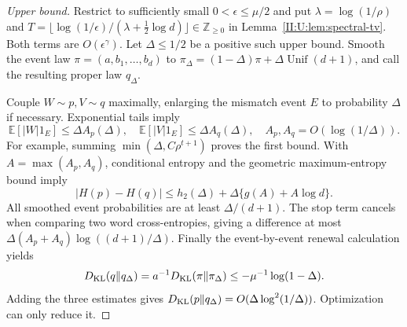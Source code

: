 \begin{proof}[Upper bound]
Restrict to sufficiently small $0<\epsilon\le\mu/2$ and put
$\lambda=\log(1/\rho)$ and
$T=\lfloor\log(1/\epsilon)/(\lambda+\tfrac12\log d)\rfloor\in\mathbb Z_{\ge0}$ in
Lemma~\ref{II:U:lem:spectral-tv}. Both terms are $O(\epsilon^\gamma)$.
Let $\Delta\le1/2$ be a positive such upper bound. Smooth the event
law $\pi=(a,b_1,\ldots,b_d)$ to
$\pi_\Delta=(1-\Delta)\pi+\Delta\operatorname{Unif}(d+1)$,
and call the resulting proper law $q_\Delta$.

Couple $W\sim p,V\sim q$ maximally, enlarging the mismatch event $E$
to probability $\Delta$ if necessary. Exponential tails imply
\[
 \mathbb E[|W|1_E]\le\Delta A_p(\Delta),\quad
 \mathbb E[|V|1_E]\le\Delta A_q(\Delta),\quad A_p,A_q=O(\log(1/\Delta)).
\]
For example, summing $\min(\Delta,C\rho^{t+1})$ proves the first
bound. With $A=\max(A_p,A_q)$, conditional entropy and the geometric
maximum-entropy bound imply
\[
 |H(p)-H(q)|\le h_2(\Delta)+\Delta\{g(A)+A\log d\}.
\]
All smoothed event probabilities are at least $\Delta/(d+1)$. The stop
term cancels when comparing two word cross-entropies, giving a difference
at most $\Delta(A_p+A_q)\log((d+1)/\Delta)$.
Finally the event-by-event renewal calculation yields
\[
 D_{\rm KL}(q\|q_\Delta)=a^{-1}D_{\rm KL}(\pi\|\pi_\Delta)
 \le-\mu^{-1}\log(1-\Delta).
\]
Adding the three estimates gives $D_{\rm KL}(p\|q_\Delta)
=O(\Delta\log^2(1/\Delta))$. Optimization can only reduce it.
\end{proof}
